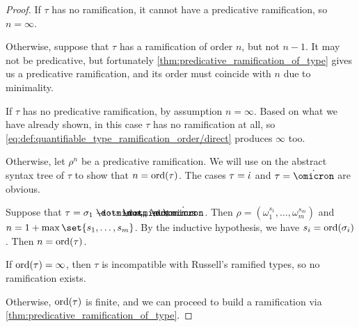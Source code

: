 \begin{proof}
   If \( \tau \) has no ramification, it cannot have a predicative ramification, so \( n = \infty \).

  Otherwise, suppose that \( \tau \) has a ramification of order \( n \), but not \( n - 1 \). It may not be predicative, but fortunately \cref{thm:predicative_ramification_of_type} gives us a predicative ramification, and its order must coincide with \( n \) due to minimality.

   If \( \tau \) has no predicative ramification, by assumption \( n = \infty \). Based on what we have already shown, in this case \( \tau \) has no ramification at all, so \eqref{eq:def:quantifiable_type_ramification_order/direct} produces \( \infty \) too.

  Otherwise, let \( \rho^n \) be a predicative ramification. We will use  on the abstract syntax tree of \( \tau \) to show that \( n = \operatorname{ord}(\tau) \). The cases \( \tau = \dot{\iota} \) and \( \tau = \syn\omicron \) are obvious.

  Suppose that \( \tau = \sigma_1 \synimplies \cdots \synimplies \sigma_m \synimplies \syn\omicron \). Then \( \rho = (\omega_1^{s_1}, \ldots, \omega_m^{s_m}) \) and \( n = 1 + \max\set{ s_1, \ldots, s_m } \). By the inductive hypothesis, we have \( s_i = \operatorname{ord}(\sigma_i) \). Then \( n = \operatorname{ord}(\tau) \).

   If \( \operatorname{ord}(\tau) = \infty \), then \( \tau \) is incompatible with Russell's ramified types, so no ramification exists.

  Otherwise, \( \operatorname{ord}(\tau) \) is finite, and we can proceed to build a ramification via \cref{thm:predicative_ramification_of_type}.
\end{proof}

